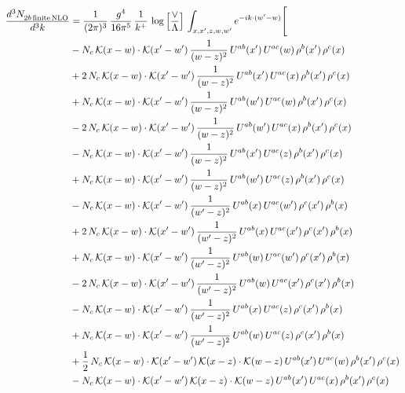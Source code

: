 \documentclass[9pt]{article}
\numberwithin{equation}{section}
\begin{document}
\begin{align}
    \frac{d^{3}N_{2b\,\rm finite\, NLO}^{\rm}}{d^{3}k} & = \frac{1}{(2\pi)^{3}}\,\frac{g^{4}}{16\pi^{5}}\,\frac{1}{k^{+}}\,\log{\left[\frac{\vee}{\Lambda}\right]}\,\int_{x,x',z,w,w'}e^{-ik\cdot(w'-w)}\Bigg[\notag\\ & -N_{c}\,\mathcal{K}(x-w)\cdot\mathcal{K}(x'-w')\,\frac{1}{(w-z)^{2}}\,U^{ab}(x')\,U^{ac}(w)\,\rho^{b}(x')\,\rho^{c}(x)\notag\\
&+2\,N_{c}\,\mathcal{K}(x-w)\cdot\mathcal{K}(x'-w')\,\frac{1}{(w-z)^{2}}\,U^{ab}(x')\,U^{ac}(x)\,\rho^{b}(x')\,\rho^{c}(x)\notag\\
&+N_{c}\,\mathcal{K}(x-w)\cdot\mathcal{K}(x'-w')\,\frac{1}{(w-z)^{2}}\,U^{ab}(w')\,U^{ac}(w)\,\rho^{b}(x')\,\rho^{c}(x)\notag\\
&-2\,N_{c}\,\mathcal{K}(x-w)\cdot\mathcal{K}(x'-w')\,\frac{1}{(w-z)^{2}}\,U^{ab}(w')\,U^{ac}(x)\,\rho^{b}(x')\,\rho^{c}(x)\notag\\
&-N_{c}\,\mathcal{K}(x-w)\cdot\mathcal{K}(x'-w')\,\frac{1}{(w-z)^{2}}\,U^{ab}(x')\,U^{ac}(z)\,\rho^{b}(x')\,\rho^{c}(x)\notag\\
&+N_{c}\,\mathcal{K}(x-w)\cdot\mathcal{K}(x'-w')\,\frac{1}{(w-z)^{2}}\,U^{ab}(w')\,U^{ac}(z)\,\rho^{b}(x')\,\rho^{c}(x)\notag\\
&-N_{c}\,\mathcal{K}(x-w)\cdot\mathcal{K}(x'-w')\,\frac{1}{(w'-z)^{2}}\,U^{ab}(x)\,U^{ac}(w')\,\rho^{c}(x')\,\rho^{b}(x)\notag\\
&+2\,N_{c}\,\mathcal{K}(x-w)\cdot\mathcal{K}(x'-w')\,\frac{1}{(w'-z)^{2}}\,U^{ab}(x)\,U^{ac}(x')\,\rho^{c}(x')\,\rho^{b}(x)\notag\\
&+N_{c}\,\mathcal{K}(x-w)\cdot\mathcal{K}(x'-w')\,\frac{1}{(w'-z)^{2}}\,U^{ab}(w)\,U^{ac}(w')\,\rho^{c}(x')\,\rho^{b}(x)\notag\\
&-2\,N_{c}\,\mathcal{K}(x-w)\cdot\mathcal{K}(x'-w')\,\frac{1}{(w'-z)^{2}}\,U^{ab}(w)\,U^{ac}(x')\,\rho^{c}(x')\,\rho^{b}(x)\notag\\
&-N_{c}\,\mathcal{K}(x-w)\cdot\mathcal{K}(x'-w')\,\frac{1}{(w'-z)^{2}}\,U^{ab}(x)\,U^{ac}(z)\,\rho^{c}(x')\,\rho^{b}(x)\notag\\
&+N_{c}\,\mathcal{K}(x-w)\cdot\mathcal{K}(x'-w')\,\frac{1}{(w'-z)^{2}}\,U^{ab}(w)\,U^{ac}(z)\,\rho^{c}(x')\,\rho^{b}(x)\notag\\
&+\frac{1}{2}\,N_{c}\,\mathcal{K}(x-w)\cdot\mathcal{K}(x'-w')\,\mathcal{K}(x-z)\cdot\mathcal{K}(w-z)\,U^{ab}(x')\,U^{ac}(w)\,\rho^{b}(x')\,\rho^{c}(x)\notag\\
&-N_{c}\,\mathcal{K}(x-w)\cdot\mathcal{K}(x'-w')\,\mathcal{K}(x-z)\cdot\mathcal{K}(w-z)\,U^{ab}(x')\,U^{ac}(x)\,\rho^{b}(x')\,\rho^{c}(x)\notag\\

\end{align}
\end{document}
